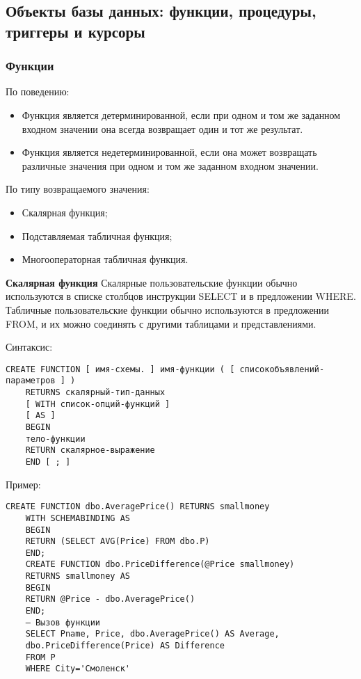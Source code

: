 \newpage
\subsection{Объекты базы данных: функции, процедуры, триггеры и курсоры}

\subsubsection{Функции}

По поведению:
\begin{itemize}
	\item Функция является детерминированной, если при одном и том же
	заданном входном значении она всегда возвращает один и тот же
	результат.
	\item Функция является недетерминированной, если она может возвращать
	различные значения при одном и том же заданном входном значении.
\end{itemize}

По типу возвращаемого значения:
\begin{itemize}
	\item Скалярная функция;
	\item Подставляемая табличная функция;
	\item Многооператорная табличная функция.
\end{itemize}

\textbf{Скалярная функция}
Скалярные пользовательские функции обычно используются в списке столбцов инструкции
SELECT и в предложении WHERE. Табличные пользовательские функции обычно
используются в предложении FROM, и их можно соединять с другими таблицами и
представлениями.

Синтаксис:
\begin{lstlisting}[label=scalarfuncsint]
	CREATE FUNCTION [ имя-схемы. ] имя-функции ( [ списокобъявлений-параметров ] )
	RETURNS скалярный-тип-данных
	[ WITH список-опций-функций ]
	[ AS ]
	BEGIN
	тело-функции
	RETURN скалярное-выражение
	END [ ; ]
\end{lstlisting}
Пример:
\begin{lstlisting}[label=scalarfuncexample]
	CREATE FUNCTION dbo.AveragePrice() RETURNS smallmoney
	WITH SCHEMABINDING AS
	BEGIN
	RETURN (SELECT AVG(Price) FROM dbo.P)
	END;
	CREATE FUNCTION dbo.PriceDifference(@Price smallmoney)
	RETURNS smallmoney AS
	BEGIN
	RETURN @Price - dbo.AveragePrice()
	END;
	— Вызов функции
	SELECT Pname, Price, dbo.AveragePrice() AS Average,
	dbo.PriceDifference(Price) AS Difference
	FROM P
	WHERE City='Смоленск'
\end{lstlisting}

